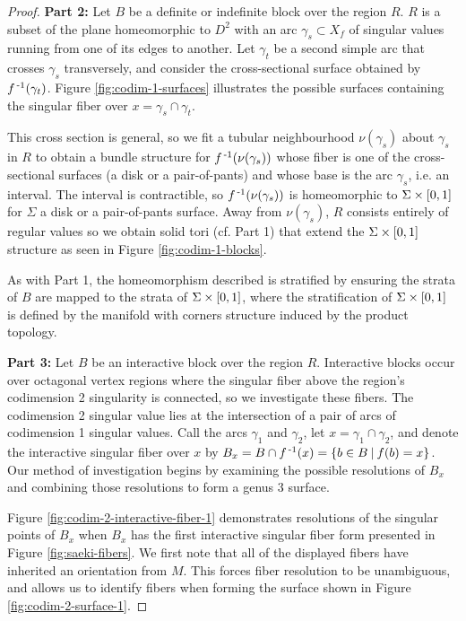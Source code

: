\begin{proof}
	\textbf{Part 2:}
	Let $B$ be a definite or indefinite block over the region $R$.
	$R$ is a subset of the plane homeomorphic to $D^2$ with an arc $\gamma_s \subset X_f$ of singular values running from one of its edges to another.
	Let $\gamma_t$ be a second simple arc that crosses $\gamma_s$ transversely, and consider the cross-sectional surface obtained by $f^{\,\text{-}1}(\gamma_t)$.
	Figure \ref{fig:codim-1-surfaces} illustrates the possible surfaces containing the singular fiber over $x=\gamma_s\cap\gamma_t$.
		



	This cross section is general, so we fit a tubular neighbourhood $\nu(\gamma_s)$ about $\gamma_s$ in $R$ to obtain a bundle structure for $f^{\,\text{-}1}(\nu(\gamma_s))$ whose fiber is one of the cross-sectional surfaces (a disk or a pair-of-pants) and whose base is the arc $\gamma_s$, i.e. an interval.
	The interval is contractible, so $f^{\,\text{-}1}(\nu(\gamma_s))$ is homeomorphic to $\Sigma\times[0,1]$ for $\Sigma$ a disk or a pair-of-pants surface.
	Away from $\nu(\gamma_s)$, $R$ consists entirely of regular values so we obtain solid tori (cf. Part 1) that extend the $\Sigma\times[0,1]$ structure as seen in Figure \ref{fig:codim-1-blocks}.

	As with Part 1, the homeomorphism described is stratified by ensuring the strata of $B$ are mapped to the strata of $\Sigma \times [0,1]$, where the stratification of $\Sigma \times [0,1]$ is defined by the manifold with corners structure induced by the product topology.
	
	\textbf{Part 3:}	
	Let $B$ be an interactive block over the region $R$.
	Interactive blocks occur over octagonal vertex regions where the singular fiber above the region's codimension 2 singularity is connected, so we investigate these fibers.
	The codimension 2 singular value lies at the intersection of a pair of arcs of codimension 1 singular values.
	Call the arcs $\gamma_1$ and $\gamma_2$, let $x = \gamma_1\cap \gamma_2$, and denote the interactive singular fiber over $x$ by $B_x = B\cap f^{\,\text{-}1}(x) = \{b\in B\:|\:f(b)=x\}$.
	Our method of investigation begins by examining the possible resolutions of $B_x$ and combining those resolutions to form a genus 3 surface.
	 
	Figure \ref{fig:codim-2-interactive-fiber-1} demonstrates resolutions of the singular points of $B_x$ when $B_x$ has the first interactive singular fiber form presented in Figure \ref{fig:saeki-fibers}.
	We first note that all of the displayed fibers have inherited an orientation from $M$.
	This forces fiber resolution to be unambiguous, and allows us to identify fibers when forming the surface shown in Figure \ref{fig:codim-2-surface-1}.
	

\end{proof}
